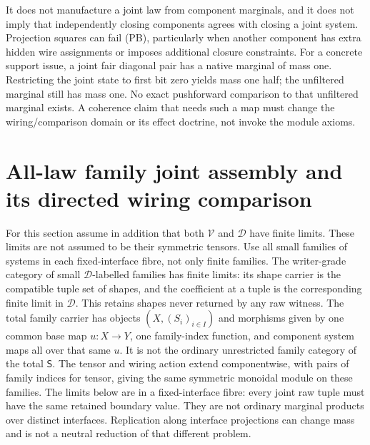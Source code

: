 \documentclass{article}
\begin{document}
It does not manufacture a joint law from component marginals, and it does not imply that independently closing components agrees with closing a joint system. Projection squares can fail (PB), particularly when another component has extra hidden wire assignments or imposes additional closure constraints. For a concrete support issue, a joint fair diagonal pair has a native marginal of mass one. Restricting the joint state to first bit zero yields mass one half; the unfiltered marginal still has mass one. No exact pushforward comparison to that unfiltered marginal exists. A coherence claim that needs such a map must change the wiring/comparison domain or its effect doctrine, not invoke the module axioms.

\section{All-law family joint assembly and its directed wiring comparison}
For this section assume in addition that both $\mathcal V$ and $\mathcal D$ have finite limits. These limits are not assumed to be their symmetric tensors. Use all small families of systems in each fixed-interface fibre, not only finite families. The writer-grade category of small $\mathcal D$-labelled families has finite limits: its shape carrier is the compatible tuple set of shapes, and the coefficient at a tuple is the corresponding finite limit in $\mathcal D$. This retains shapes never returned by any raw witness. The total family carrier has objects $(X,(S_i)_{i\in I})$ and morphisms given by one common base map $u:X\to Y$, one family-index function, and component system maps all over that same $u$. It is not the ordinary unrestricted family category of the total $\mathsf S$. The tensor and wiring action extend componentwise, with pairs of family indices for tensor, giving the same symmetric monoidal module on these families. The limits below are in a fixed-interface fibre: every joint raw tuple must have the same retained boundary value. They are not ordinary marginal products over distinct interfaces. Replication along interface projections can change mass and is not a neutral reduction of that different problem.
\end{document}
